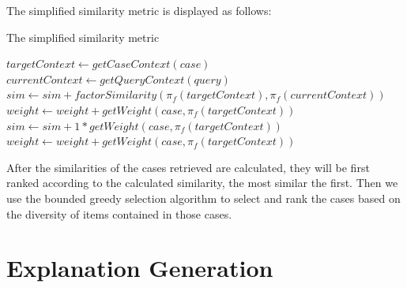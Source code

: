 The simplified similarity metric is displayed as follows:
\begin{algorithm}
\caption{The simplified similarity metric}
\label{list:similarity}
\begin{algorithmic}
	\State $targetContext \gets getCaseContext(case)$
	\State $currentContext \gets getQueryContext(query)$
			\State $sim \gets sim +  factorSimilarity(\pi_f(targetContext), \pi_f(currentContext))$
			\State $weight \gets weight + getWeight(case,\pi_f(targetContext))$
		\Else
			\State $sim \gets sim +  1*getWeight(case,\pi_f(targetContext))$
			\State $weight \gets weight + getWeight(case,\pi_f(targetContext))$
		\EndIf
	\EndFor
\EndFunction
\end{algorithmic}
\end{algorithm}

After the similarities of the cases retrieved are calculated, they will be first ranked according to the calculated similarity, the most similar the first. Then we use the bounded greedy selection algorithm to select and rank the cases based on the diversity of items contained in those cases. 

\section{Explanation Generation} \label{sec:eg}

